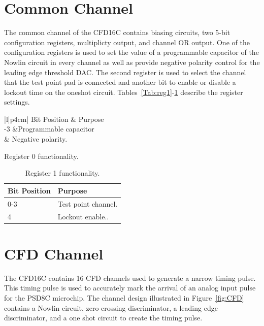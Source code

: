 \documentclass[12pt,oneside,final]{siuethesis}
\theoremstyle{definition}
\begin{document}
\section{Common Channel}
\par The common channel of the CFD16C contains biasing circuits, two 5-bit configuration registers, multiplicty output, and channel OR output. One of the configuration registers is used to set the value of a programmable capacitor of the Nowlin circuit in every channel as well as provide negative polarity control for the leading edge threshold DAC. The second register is used to select the channel that the test point pad is connected and another bit to enable or disable a lockout time on the oneshot circuit.  Tables~\ref{Tab:reg1}-\ref{Tab:reg2} describe the register settings.
\begin{table}[h]
\parbox{.45\linewidth}{
\centering
	\begin{tabular}{|l|p{4cm}|}
		\hline
		Bit Position & Purpose\\-3 &Programmable capacitor\\ & Negative polarity.\\\hline
	\end{tabular}
    \caption{Register 0 functionality.}
 	\label{Tab:reg1}
 	}
 	\hfill
\parbox{.45\linewidth}{
	\begin{tabular}{|l|p{4cm}|}
		\hline
		Bit Position & Purpose\\\hline
		0-3 & Test point channel.\\\hline
		4 & Lockout enable..\\\hline
	\end{tabular}
    \caption{Register 1 functionality.}
 	\label{Tab:reg2}
    }
\end{table}

\section{CFD Channel}
\par The CFD16C contains 16 CFD channels used to generate a narrow timing pulse. This timing pulse is used to accurately mark the arrival of an analog input pulse for the PSD8C microchip. The channel design illustrated in Figure~\ref{fig:CFD} contains a Nowlin circuit, zero crossing discriminator, a leading edge discriminator, and a one shot circuit to create the timing pulse.
\end{document}
